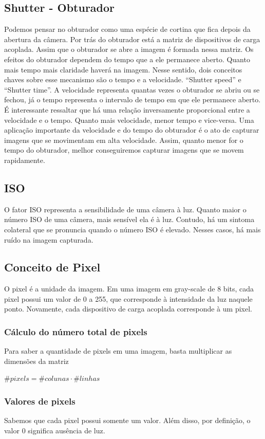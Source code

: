 \documentclass[a4paper, 12pt]{article}
\begin{document}
\subsection{Shutter - Obturador}
Podemos pensar no obturador como uma espécie de cortina que fica depois da abertura da câmera. Por trás do obturador está a matriz de 
dispositivos de carga acoplada. Assim que o obturador se abre a imagem é formada nessa matriz. Os efeitos do obturador dependem do tempo 
que a ele permanece aberto. Quanto mais tempo mais claridade haverá na imagem. Nesse sentido, dois conceitos chaves sobre esse mecanismo 
são o tempo e a velocidade. ``Shutter speed'' e ``Shutter time''. A velocidade representa quantas vezes o obturador se abriu ou se fechou, já o tempo 
representa o intervalo de tempo em que ele permanece aberto. É interessante ressaltar que há uma relação inversamente proporcional 
entre a velocidade e o tempo. Quanto mais velocidade, menor tempo e vice-versa. Uma aplicação importante da velocidade e do tempo do obturador é o ato de 
capturar imagens que se movimentam em alta velocidade. Assim, quanto menor for o tempo do obturador, melhor conseguiremos capturar imagens que se movem rapidamente.

\subsection{ISO}
O fator ISO representa a sensibilidade de uma câmera à luz. Quanto maior o número ISO de uma câmera, mais sensível ela é à luz. 
Contudo, há um sintoma colateral que se pronuncia quando o número ISO é elevado. Nesses casos, há mais ruído na imagem capturada.

\subsection{Conceito de Pixel}
O pixel é a unidade da imagem. Em uma imagem em gray-scale de 8 bits, cada pixel possui um valor de 0 a 255, que corresponde à intensidade 
da luz naquele ponto. Novamente, cada dispositivo de carga acoplada corresponde à um pixel.
\subsubsection{Cálculo do número total de pixels}
Para saber a quantidade de pixels em uma imagem, basta multiplicar as dimensões da matriz
\begin{center}
	$\#pixels = \#colunas \cdot \#linhas$
\end{center}
\subsubsection{Valores de pixels}
Sabemos que cada pixel possui somente um valor. Além disso, por definição, o valor $0$ significa ausência de luz.
\end{document}
